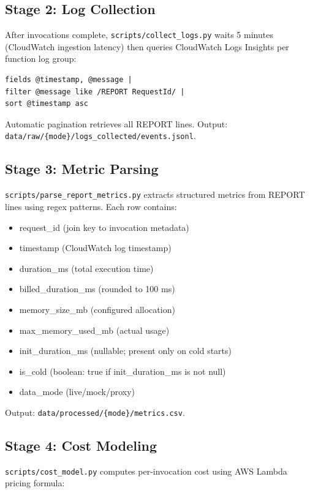 \subsection{Stage 2: Log Collection}

After invocations complete, \texttt{scripts/collect\_logs.py} waits 5 minutes (CloudWatch ingestion latency) then queries CloudWatch Logs Insights per function log group:

\begin{verbatim}
fields @timestamp, @message | 
filter @message like /REPORT RequestId/ | 
sort @timestamp asc
\end{verbatim}

Automatic pagination retrieves all REPORT lines. Output: \texttt{data/raw/\{mode\}/logs\_collected/events.jsonl}.

\subsection{Stage 3: Metric Parsing}

\texttt{scripts/parse\_report\_metrics.py} extracts structured metrics from REPORT lines using regex patterns. Each row contains:

\begin{itemize}
    \item request\_id (join key to invocation metadata)
    \item timestamp (CloudWatch log timestamp)
    \item duration\_ms (total execution time)
    \item billed\_duration\_ms (rounded to 100 ms)
    \item memory\_size\_mb (configured allocation)
    \item max\_memory\_used\_mb (actual usage)
    \item init\_duration\_ms (nullable; present only on cold starts)
    \item is\_cold (boolean: true if init\_duration\_ms is not null)
    \item data\_mode (live/mock/proxy)
\end{itemize}

Output: \texttt{data/processed/\{mode\}/metrics.csv}.

\subsection{Stage 4: Cost Modeling}

\texttt{scripts/cost\_model.py} computes per-invocation cost using AWS Lambda pricing formula:

